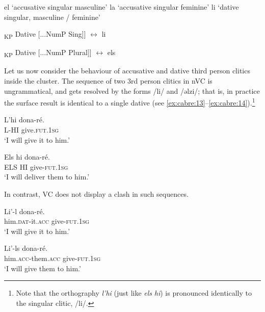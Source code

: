 \documentclass[output=paper,modfonts,nonflat,newtxmath,colorlinks,citecolor=brown]{langsci/langscibook}
\begin{document}
\ea%
    \label{ex:cabre:11}
    \ea el ‘accusative singular masculine’
    \ex la ‘accusative singular feminine’
    \ex li ‘dative singular, masculine / feminine’
    \z
    \z

\ea%
    \label{ex:cabre:12}
   \ea {[}\textsubscript{KP}  Dative [...NumP Sing]{]} $\longleftrightarrow$ li

   \ex {[}\textsubscript{KP} Dative   [...NumP Plural]{]} $\longleftrightarrow$ els
   \z
    \z

Let us now consider the behaviour of accusative and dative third person clitics inside the cluster. The sequence of two 3rd person clitics in nVC is ungrammatical, and gets resolved by the forms /li/ and /ǝlzi/; that is, in practice the surface result is identical to a single dative (see \ref{ex:cabre:13}--\ref{ex:cabre:14}).\footnote{Note that the orthography \textit{l’hi} (just like \textit{els} \textit{hi}) is pronounced identically to the singular clitic, /li/.} %

\ea
    \label{ex:cabre:13}

    \ex
    \gll L’hi     dona-ré.\\
    L-HI    give.\textsc{fut.1sg}\\
    \glt ‘I will give it to him.’
    \z
    \z

\ea%
    \label{ex:cabre:14}

   \ex
   \gll Els hi  dona-ré.\\
   ELS HI  give-\textsc{fut.1sg}\\
   \glt ‘I will deliver them to him.’
   \z
   \z


In contrast, VC does not display a clash in such sequences.

\ea%
    \label{ex:cabre:15}
     \ea
    \gll Li’-l     dona-ré. \\
    	him.\textsc{dat}-it.\textsc{acc} give-\textsc{fut.1sg} \\
    	\glt ‘I will give it to him.’

    \ex
    \gll Li’-ls    dona-ré.\\
    him.\textsc{acc}-them.\textsc{acc} give-\textsc{fut.1sg}  \\
    \glt  ‘I will give them to him.’
    \z
    \z
\end{document}

